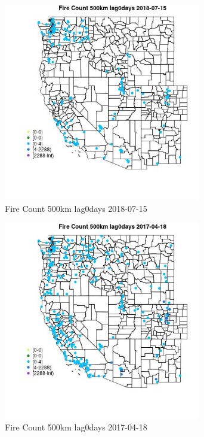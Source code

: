 \begin{figure} 
\centering  
\includegraphics[width=0.77\textwidth]{Code_Outputs/Report_ML_input_PM25_Step4_part_e_de_duplicated_aves_compiled_2019-05-21wNAs_MapObsFire_Count_500km_lag0days2018-07-15.jpg} 
\caption{\label{fig:Report_ML_input_PM25_Step4_part_e_de_duplicated_aves_compiled_2019-05-21wNAsMapObsFire_Count_500km_lag0days2018-07-15}Fire Count 500km lag0days 2018-07-15} 
\end{figure} 
 

\clearpage 

\begin{figure} 
\centering  
\includegraphics[width=0.77\textwidth]{Code_Outputs/Report_ML_input_PM25_Step4_part_e_de_duplicated_aves_compiled_2019-05-21wNAs_MapObsFire_Count_500km_lag0days2017-04-18.jpg} 
\caption{\label{fig:Report_ML_input_PM25_Step4_part_e_de_duplicated_aves_compiled_2019-05-21wNAsMapObsFire_Count_500km_lag0days2017-04-18}Fire Count 500km lag0days 2017-04-18} 
\end{figure} 
 

